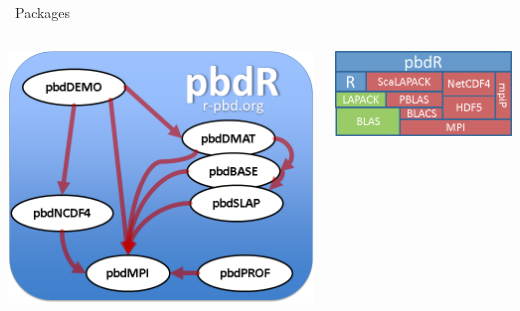 \begin{frame}
  \begin{block}{\pbdR\ Packages}
    \begin{center}
      \begin{columns}\hspace{.2cm}
        \begin{column}{.52\textwidth}
          \includegraphics[scale=.4]{../common/pics/pbdR}
        \end{column}
        \hspace{.05cm}
        \begin{column}{.4\textwidth}
          \includegraphics[scale=.45]{../common/pics/libs}
        \end{column}
      \end{columns}
    \end{center}
  \end{block}
\end{frame}

